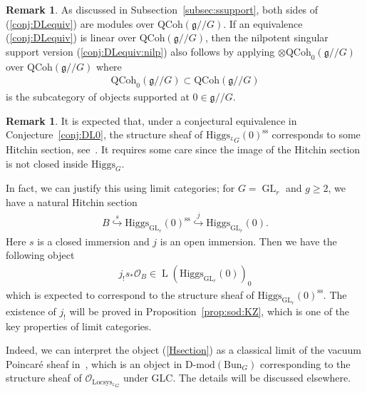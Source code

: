 \documentclass [11pt,oneside,a4paper,mathscr]{amsart}
\theoremstyle{definition}
\newtheorem{remark}[thm]{Remark}
\renewcommand{\geq}{\geqslant}
\newcommand{\LL}{\operatorname{L}}
\newcommand{\fg}{\mathfrak{g}}
\newcommand{\GL}{\operatorname{GL}}
\newcommand{\ssslash}{/\!\!/}
\newcommand{\Hig}{\mathrm{Higgs}}
\newcommand{\Bun}{\mathrm{Bun}}
\begin{document}
\begin{remark}\label{rmk:nilpeq}
    As discussed in Subsection~\ref{subsec:ssupport}, both sides of (\ref{conj:DLequiv}) are 
    modules over $\mathrm{QCoh}(\fg\ssslash G)$.
    If an equivalence (\ref{conj:DLequiv}) is linear over $\mathrm{QCoh}(\fg\ssslash G)$, 
    then the nilpotent singular support version (\ref{conj:DLequiv:nilp}) also follows by applying 
    $\otimes\mathrm{QCoh}_0(\fg\ssslash G)$ over $\mathrm{QCoh}(\fg\ssslash G)$
    where 
    \begin{align*}\mathrm{QCoh}_0(\fg\ssslash G) \subset \mathrm{QCoh}(\fg\ssslash G)
    \end{align*} is the 
    subcategory of objects supported at $0\in \fg\ssslash G$. 
\end{remark}

\begin{remark}\label{rmk:Hitchin}
It is expected that, under a conjectural equivalence in Conjecture~\ref{conj:DL0}, 
the structure sheaf of $\Hig_{^{L}G}(0)^{\mathrm{ss}}$ corresponds to some Hitchin section, see~\cite[Section~3.4]{HauICM}. 
It requires some care since the image of the Hitchin section is not closed inside 
$\Hig_G$. 

In fact, we can justify this using limit categories; for $G=\GL_r$ and $g\geq 2$, 
we have a natural Hitchin section 
\begin{align*}
B\stackrel{s}{\hookrightarrow} \Hig_{\GL_r}(0)^{\mathrm{ss}} \stackrel{j}{\hookrightarrow} \Hig_{\GL_r}(0).
\end{align*}
Here $s$ is a closed immersion and $j$ is an open immersion. 
Then we have the following object 
\begin{align}\label{Hsection}
    j_{!} s_{*}\mathcal{O}_B \in \LL(\Hig_{\GL_r}(0))_0
\end{align}
which is expected to correspond to the structure sheaf of $\Hig_{\GL_r}(0)^{\mathrm{ss}}$. 
The existence of $j_!$ will be proved in Proposition~\ref{prop:sod:KZ}, which is one of the key 
properties of limit categories. 

Indeed, we can interpret the object (\ref{Hsection}) as a classical limit of the 
vacuum Poincar\'{e} sheaf in~\cite{GLC1}, which is an object in $\text{D-mod}(\Bun_G)$
corresponding to the structure sheaf of $\mathcal{O}_{\mathrm{Locsys}_{^{L}G}}$ under GLC.
The details will be discussed elsewhere. 
\end{remark}
\end{document}

